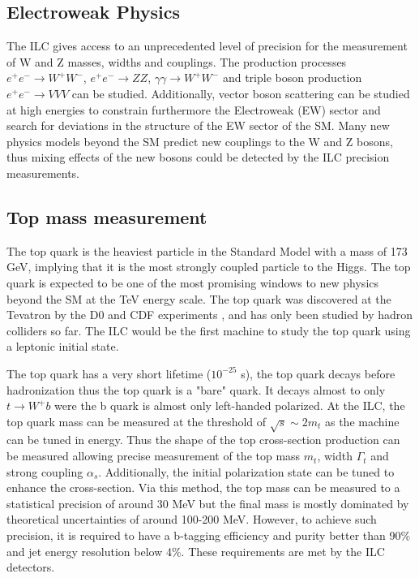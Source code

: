 \subsection{Electroweak Physics}

The ILC gives access to an unprecedented level of precision for the measurement of W and Z masses, widths and couplings. The production processes $e^+e^- \rightarrow W^+W^-$, $e^+e^- \rightarrow ZZ$, $\gamma\gamma \rightarrow W^+W^-$ and triple boson production $e^+e^- \rightarrow VVV$ can be studied. Additionally, vector boson scattering can be studied at high energies to constrain furthermore the Electroweak (EW) sector and search for deviations in the structure of the EW sector of the SM. Many new physics models beyond the SM predict new couplings to the W and Z bosons, thus mixing effects of the new bosons could be detected by the ILC precision measurements.

\subsection{Top mass measurement}

The top quark is the heaviest particle in the Standard Model with a mass of 173 GeV, implying that it is the most strongly coupled particle to the Higgs. The top quark is expected to be one of the most promising windows to new physics beyond the SM at the TeV energy scale. The top quark was discovered at the Tevatron by the D0 and CDF experiments \cite{Abe:1995hr, D0:1995jca}, and has only been studied by hadron colliders so far. The ILC would be the first machine to study the top quark using a leptonic initial state.

The top quark has a very short lifetime ($10^{-25}$ s), the top quark decays before hadronization thus the top quark is a "bare" quark. It decays almost to only $t \rightarrow W^+b$ were the b quark is almost only left-handed polarized. At the ILC, the top quark mass can be measured at the threshold of $\sqrt{s} \sim 2 m_t$ as the machine can be tuned in energy. Thus the shape of the top cross-section production can be measured allowing precise measurement of the top mass $m_t$, width $\Gamma_t$ and strong coupling $\alpha_s$. Additionally, the initial polarization state can be tuned to enhance the cross-section. Via this method, the top mass can be measured to a statistical precision of around 30 MeV but the final mass is mostly dominated by theoretical uncertainties of around 100-200 MeV. However, to achieve such precision, it is required to have a b-tagging efficiency and purity better than 90\% and jet energy resolution below 4\%. These requirements are met by the ILC detectors.

